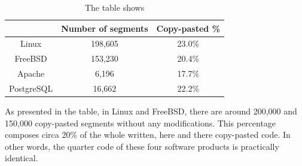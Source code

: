 \documentclass{report}
\begin{document}
\begin{table}[h]
\centering
\label{products_compare}
\begin{tabular}{|c|c|c|}
\hline
\rowcolor[HTML]{C0C0C0} 
\multicolumn{1}{|l|}{\cellcolor[HTML]{C0C0C0}\textbf{Project}} & \multicolumn{1}{l|}{\cellcolor[HTML]{C0C0C0}\textbf{Number of segments}} & \multicolumn{1}{l|}{\cellcolor[HTML]{C0C0C0}\textbf{Copy-pasted \%}} \\ \hline
Linux                                                          & 198,605                                                                   & 23.0\%                                                               \\ \hline
FreeBSD                                                        & 153,230                                                                   & 20.4\%                                                               \\ \hline
Apache                                                         & 6,196                                                                     & 17.7\%                                                               \\ \hline
PostgreSQL                                                     & 16,662                                                                     & 22.2\%                                                               \\ \hline
\end{tabular}
\caption{The table shows}
\end{table}
As presented in the table, in Linux and FreeBSD, there are around 200,000 and 150,000 copy-pasted segments without any modifications. This percentage composes circa 20\% of the whole written, here and there copy-pasted code. In other words, the quarter code of these four software products is practically identical.

\newpage	
\end{document}
